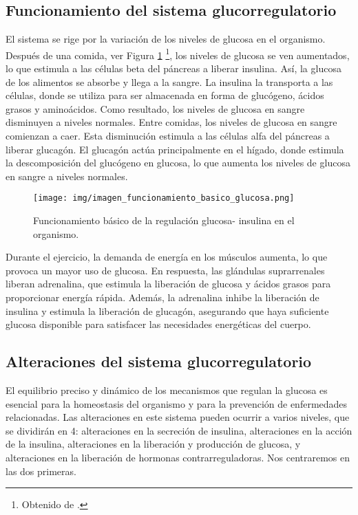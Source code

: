 \subsection{Funcionamiento del sistema glucorregulatorio}
El sistema se rige por la variación de los niveles de glucosa en el organismo. 
Después de una comida, ver Figura \ref{fig:basico_glucorregulatorio} \footnote{Obtenido de \cite{velasquez2013modelado}.}, los niveles de glucosa se ven aumentados, lo que estimula a las células beta del páncreas a liberar insulina. Así, la glucosa de los alimentos se absorbe y llega a la sangre. La insulina la transporta a las células, donde se utiliza para ser almacenada en forma de glucógeno, ácidos grasos y aminoácidos. Como resultado, los niveles de glucosa en sangre disminuyen a niveles normales. Entre comidas, los niveles de glucosa en sangre comienzan a caer. Esta disminución estimula a las células alfa del páncreas a liberar glucagón. El glucagón actúa principalmente en el hígado, donde estimula la descomposición del glucógeno en glucosa, lo que aumenta los niveles de glucosa en sangre a niveles normales.

\begin{figure}[h]
    \centering
    \texttt{[image: img/imagen\_funcionamiento\_basico\_glucosa.png]}
    \caption{Funcionamiento básico de la regulación glucosa- insulina en el organismo.}
    \label{fig:basico_glucorregulatorio}
\end{figure}

Durante el ejercicio, la demanda de energía en los músculos aumenta, lo que provoca un mayor uso de glucosa. En respuesta, las glándulas suprarrenales liberan adrenalina, que estimula la liberación de glucosa y ácidos grasos para proporcionar energía rápida. Además, la adrenalina inhibe la liberación de insulina y estimula la liberación de glucagón, asegurando que haya suficiente glucosa disponible para satisfacer las necesidades energéticas del cuerpo.

\subsection{Alteraciones del sistema glucorregulatorio}

El equilibrio preciso y dinámico de los mecanismos que regulan la glucosa es esencial para la homeostasis del organismo y para la prevención de enfermedades relacionadas.
Las alteraciones en este sistema pueden ocurrir a varios niveles, que se dividirán en 4: alteraciones en la secreción de insulina, alteraciones en la acción de la insulina, alteraciones en la liberación y producción de glucosa, y alteraciones en la liberación de hormonas contrarreguladoras. Nos centraremos en las dos primeras.

